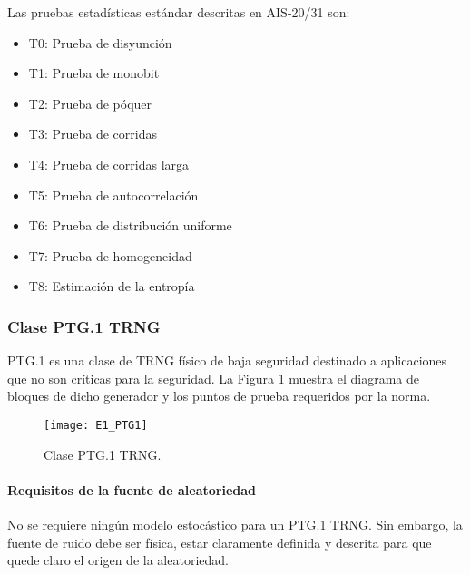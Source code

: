            Las pruebas estadísticas estándar descritas en AIS-20/31 son:

            \begin{itemize}[noitemsep]
                \item T0: Prueba de disyunción
                \item T1: Prueba de monobit  
                \item T2: Prueba de póquer
                \item T3: Prueba de corridas
                \item T4: Prueba de corridas larga
                \item T5: Prueba de autocorrelación
                \item T6: Prueba de distribución uniforme
                \item T7: Prueba de homogeneidad
                \item T8: Estimación de la entropía
            \end{itemize}
        
            \subsubsection{Clase PTG.1 TRNG}

                PTG.1 es una clase de TRNG físico de baja seguridad destinado a aplicaciones que no son críticas para la seguridad. La Figura \ref{fig:E1_PTG1} muestra el diagrama de bloques de dicho generador y los puntos de prueba requeridos por la norma.

                \begin{figure}[hbtp]
                    \caption{Clase PTG.1 TRNG.}
                    \centering
                    \texttt{[image: E1\_PTG1]}
                    \label{fig:E1_PTG1}
                \end{figure}

                \paragraph{Requisitos de la fuente de aleatoriedad\\}
                
                No se requiere ningún modelo estocástico para un PTG.1 TRNG. Sin embargo, la fuente de ruido debe ser física, estar claramente definida y descrita para que quede claro el origen de la aleatoriedad.
                
